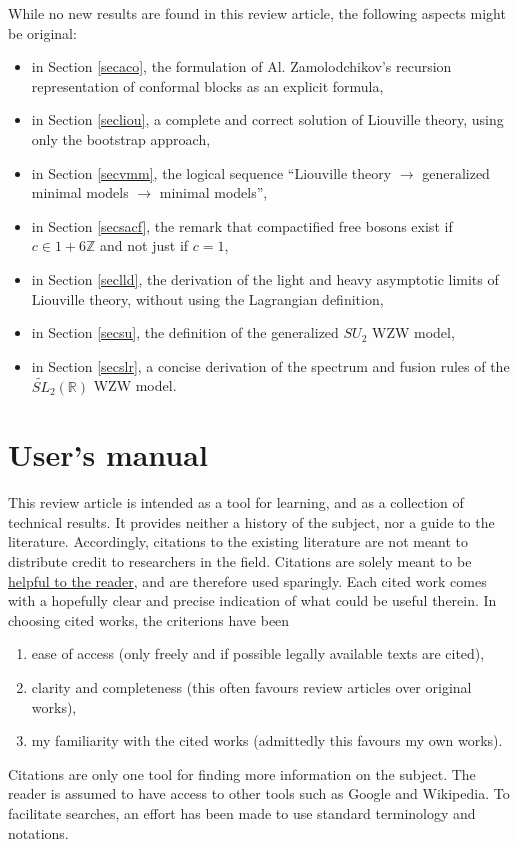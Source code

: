 \documentclass[12pt,a4paper,notitlepage]{report}
\newcommand \Z {\mathbb{Z}}
\numberwithin{equation}{section}
\theoremstyle{break}
\begin{document}
While no new results are found in this review article, the following aspects might be original:
\begin{itemize}
\item in Section \ref{secaco}, the formulation of Al. Zamolodchikov's recursion representation of conformal blocks as an explicit formula,
\item in Section \ref{secliou}, a complete and correct solution of Liouville theory, using only the bootstrap approach, 
\item in Section \ref{secvmm}, the logical sequence ``Liouville theory $\rightarrow$ generalized minimal models $\rightarrow$ minimal models'',
\item in Section \ref{secsacf}, the remark that compactified free bosons exist if $c\in 1+6\Z$ and not just if $c=1$,
\item in Section \ref{seclld}, the derivation of the light and heavy asymptotic limits of Liouville theory, without using the Lagrangian definition,
\item in Section \ref{secsu}, the definition of the generalized $SU_2$ WZW model,
\item in Section \ref{secslr}, a concise derivation of the spectrum and fusion rules of the $\widetilde{SL}_2(\mathbb{R})$ WZW model.
\end{itemize}


\section{User's manual}

This review article is intended as a tool for learning, and as a collection of technical results. It provides neither a history of the subject, nor a guide to the literature. Accordingly, citations to the existing literature are not meant to distribute credit to researchers in the field. Citations are solely meant to be 
\href{http://researchpracticesandtools.blogspot.fr/2013/08/write-for-humans-not-for-robots.html}
{helpful to the reader}, and are therefore used sparingly. Each cited work comes with a hopefully clear and precise indication of what could be useful therein. In choosing cited works, the criterions have been
\begin{enumerate}
\item ease of access (only freely and if possible legally available texts are cited), 
\item clarity and completeness (this often favours review articles over original works),
\item my familiarity with the cited works (admittedly this favours my own works). 
\end{enumerate}
Citations are only one tool for finding more information on the subject. 
The reader is assumed to have access to other tools such as Google and Wikipedia. 
To facilitate searches, an effort has been made to use standard terminology and notations. 
\end{document}
